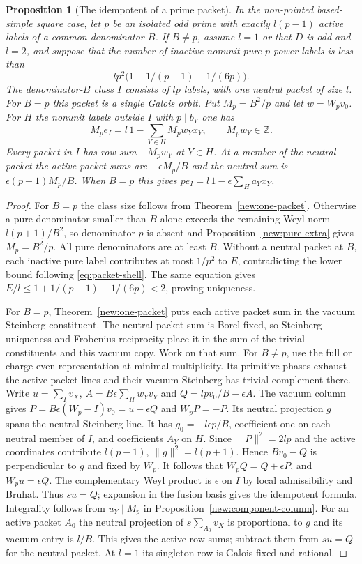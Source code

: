 \documentclass[11pt]{amsart}
\numberwithin{equation}{section}
\newtheorem{proposition}[theorem]{Proposition}
\theoremstyle{definition}
\theoremstyle{plain}
\newcommand{\ZZ}{\mathbb Z}
\begin{document}
\begin{proposition}[The idempotent of a prime packet]\label{round:packet-idempotent}
In the non-pointed based-simple square case, let $p$ be an isolated odd prime with exactly $l(p-1)$ active labels of a common denominator $B$. If $B\ne p$, assume $l=1$ or that $D$ is odd and $l=2$, and suppose that the number of inactive nonunit pure $p$-power labels is less than
\[
 l p^2\bigl(1-1/(p-1)-1/(6p)\bigr).
\]
The denominator-$B$ class $I$ consists of $lp$ labels, with one neutral packet of size $l$. For $B=p$ this packet is a single Galois orbit. Put $M_p=B^2/p$ and let $w=W_pv_0$. For $H$ the nonunit labels outside $I$ with $p\mid b_Y$ one has
\[
 M_p e_I=l\,1-\sum_{Y\in H} M_p w_Y x_Y, \qquad M_pw_Y\in\ZZ.
\]
Every packet in $I$ has row sum $-M_pw_Y$ at $Y\in H$. At a member of the neutral packet the active packet sums are $-\epsilon M_p/B$ and the neutral sum is $\epsilon(p-1)M_p/B$. When $B=p$ this gives $p e_I=l\,1-\epsilon\sum_H a_Yx_Y$.
\end{proposition}
\begin{proof}
For $B=p$ the class size follows from Theorem~\ref{new:one-packet}. Otherwise a pure denominator smaller than $B$ alone exceeds the remaining Weyl norm $l(p+1)/B^2$, so denominator $p$ is absent and Proposition~\ref{new:pure-extra} gives $M_p=B^2/p$. All pure denominators are at least $B$. Without a neutral packet at $B$, each inactive pure label contributes at most $1/p^2$ to $E$, contradicting the lower bound following \eqref{eq:packet-shell}. The same equation gives $E/l\le1+1/(p-1)+1/(6p)<2$, proving uniqueness.

For $B=p$, Theorem~\ref{new:one-packet} puts each active packet sum in the vacuum Steinberg constituent. The neutral packet sum is Borel-fixed, so Steinberg uniqueness and Frobenius reciprocity place it in the sum of the trivial constituents and this vacuum copy. Work on that sum. For $B\ne p$, use the full or charge-even representation at minimal multiplicity. Its primitive phases exhaust the active packet lines and their vacuum Steinberg has trivial complement there. Write $u=\sum_Iv_X$, $A=B\epsilon\sum_H w_Yv_Y$ and $Q=lpv_0/B-\epsilon A$. The vacuum column gives $P=B\epsilon(W_p-I)v_0=u-\epsilon Q$ and $W_pP=-P$. Its neutral projection $g$ spans the neutral Steinberg line. It has $g_0=-l\epsilon p/B$, coefficient one on each neutral member of $I$, and coefficients $A_Y$ on $H$. Since $\|P\|^2=2lp$ and the active coordinates contribute $l(p-1)$, $\|g\|^2=l(p+1)$. Hence $Bv_0-Q$ is perpendicular to $g$ and fixed by $W_p$. It follows that $W_pQ=Q+\epsilon P$, and $W_pu=\epsilon Q$. The complementary Weyl product is $\epsilon$ on $I$ by local admissibility and Bruhat. Thus $su=Q$; expansion in the fusion basis gives the idempotent formula. Integrality follows from $u_Y\mid M_p$ in Proposition~\ref{new:component-column}. For an active packet $A_0$ the neutral projection of $s\sum_{A_0}v_X$ is proportional to $g$ and its vacuum entry is $l/B$. This gives the active row sums; subtract them from $su=Q$ for the neutral packet. At $l=1$ its singleton row is Galois-fixed and rational.
\end{proof}
\end{document}
